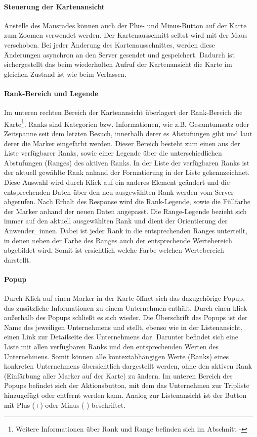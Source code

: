 \documentclass[Bachelorarbeit.tex]{subfiles}
\begin{document}
\paragraph{Steuerung der Kartenansicht}
Anstelle des Mausrades können auch der Plus- und Minus-Button auf der Karte zum Zoomen verwendet werden.
Der Kartenausschnitt selbst wird mit der Maus verschoben.
Bei jeder Änderung des Kartenausschnittes, werden diese Änderungen asynchron an den Server gesendet und gespeichert.
Dadurch ist sichergestellt das beim wiederholten Aufruf der Kartenansicht die Karte im gleichen Zustand ist wie beim Verlassen.

\paragraph{Rank-Bereich und Legende}
Im unteren rechten Bereich der Kartenansicht überlagert der Rank-Bereich die Karte\footnote{Weitere Informationen über Rank und Range befinden sich im Abschnitt  - }. Ranks sind Kategorien bzw. Informationen, wie z.B. Gesamtumsatz oder Zeitspanne seit dem letzten Besuch, innerhalb derer es Abstufungen gibt und laut derer die Marker eingefärbt werden.
Dieser Bereich besteht zum einen aus der Liste verfügbarer Ranks, sowie einer Legende über die unterschiedlichen Abstufungen (Ranges) des aktiven Ranks.
In der Liste der verfügbaren Ranks ist der aktuell gewählte Rank anhand der Formatierung in der Liste gekennzeichnet. Diese Auswahl wird durch Klick auf ein anderes Element geändert und die entsprechenden Daten über den neu ausgewählten Rank werden vom Server abgerufen.
Nach Erhalt des Response wird die Rank-Legende, sowie die Füllfarbe der Marker anhand der neuen Daten angepasst.
Die Range-Legende bezieht sich immer auf den aktuell ausgewählten Rank und dient der Orientierung der Anwender\_innen. 
Dabei ist jeder Rank in die entsprechenden Ranges unterteilt, in denen neben der Farbe des Ranges auch der entsprechende Wertebereich abgebildet wird.
Somit ist ersichtlich welche Farbe welchen Wertebereich darstellt.

\paragraph{Popup}
Durch Klick auf einen Marker in der Karte öffnet sich das dazugehörige Popup,
das zusätzliche Informationen zu einem Unternehmen enthält.
Durch einen klick außerhalb des Popups schließt es sich wieder.
Die Überschrift des Popups ist der Name des jeweiligen Unternehmens und stellt, ebenso wie in der Listenansicht, einen Link zur Detailseite des Unternehmens dar.
Darunter befindet sich eine Liste mit allen verfügbaren Ranks und den entsprechenden Werten des Unternehmens. 
Somit können alle kontextabhängigen Werte (Ranks) eines konkreten Unternehmens übersichtlich dargestellt werden, ohne den aktiven Rank (Einfärbung aller Marker auf der Karte) zu ändern. 
Im unteren Bereich des Popups befindet sich der Aktionsbutton, mit dem das Unternehmen zur Tripliste hinzugefügt oder entfernt werden kann.
Analog zur Listenansicht ist der Button mit Plus (+) oder Minus (-) beschriftet. 
\end{document}
